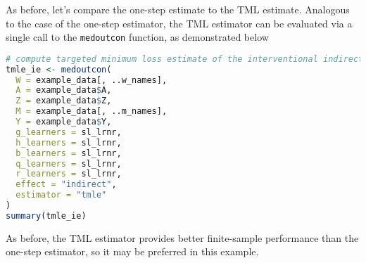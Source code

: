 \documentclass[
  12pt,
]{book}
\newcommand{\passthrough}[1]{#1}
\theoremstyle{definition}
\theoremstyle{definition}
\theoremstyle{definition}
\newcommand{\1}{\mathbbm{1}}
\begin{document}
As before, let's compare the one-step estimate to the TML estimate. Analogous
to the case of the one-step estimator, the TML estimator can be evaluated via a
single call to the \passthrough{\lstinline!medoutcon!} function, as demonstrated below

\begin{lstlisting}[language=R]
# compute targeted minimum loss estimate of the interventional indirect effect
tmle_ie <- medoutcon(
  W = example_data[, ..w_names],
  A = example_data$A,
  Z = example_data$Z,
  M = example_data[, ..m_names],
  Y = example_data$Y,
  g_learners = sl_lrnr,
  h_learners = sl_lrnr,
  b_learners = sl_lrnr,
  q_learners = sl_lrnr,
  r_learners = sl_lrnr,
  effect = "indirect",
  estimator = "tmle"
)
summary(tmle_ie)
\end{lstlisting}

As before, the TML estimator provides better finite-sample performance than the
one-step estimator, so it may be preferred in this example.

  

\backmatter
\printindex
\end{document}
